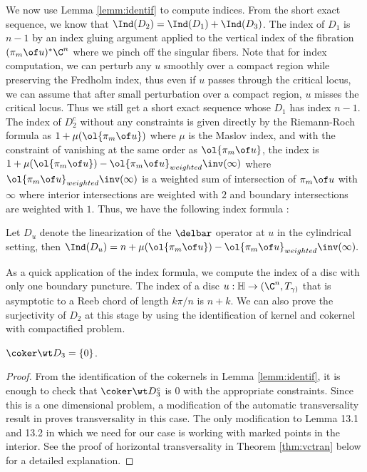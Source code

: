 We now use Lemma \ref{lemm:identif} to compute indices. From the short exact sequence, we know that $\Ind(D_2) = \Ind(D_1) + \Ind (D_3)$. The index of $D_1$ is $n-1$ by an index gluing argument applied to the vertical index of the fibration $(\pi_m \of u )^* \C^n$ where we pinch off the singular fibers. Note that for index computation, we can perturb any $u$ smoothly over a compact region while preserving the Fredholm index, thus even if $u$ passes through the critical locus, we can assume that after small perturbation over a compact region, $u$ misses the critical locus. Thus we still get a short exact sequence whose $D_1$ has index $n-1$.  The index of $D^c_2$ without any constraints is given directly by the Riemann-Roch formula as $1 + \mu(\ol{\pi_m \of u})$ where $\mu$ is the Maslov index, and with the constraint of vanishing at the same order as $\ol{\pi_m \of u}$, the index is $1 + \mu(\ol{\pi_m \of u}) - \ol{\pi_m \of u }_{weighted} \inv (\infty)$ where $\ol{\pi_m \of u }_{weighted} \inv (\infty)$ is a weighted sum of intersection of $\pi_m \of u$ with $\infty$ where interior intersections are weighted with $2$ and boundary intersections are weighted with $1$. Thus, we have the following index formula :

\begin{lemma}\label{indexLemm}
Let $D_u $ denote the linearization of the $\delbar$ operator at $u$ in the cylindrical setting, then 
$ \Ind(D_u) = n + \mu(\ol{\pi_m \of u}) - \ol{\pi_m \of u }_{weighted} \inv (\infty).$
\end{lemma}
\begin{remark} \label{rem:indexsinglepunct}

As a quick application of the index formula, we  compute the index of a disc with only one boundary puncture. The index of a disc $u : \mathbb{H} \to (\C^n, T_{\gamma)}$ that is asymptotic to a Reeb chord of length $k\pi/n$ is $n+k$. We can also prove the surjectivity of $D_2$ at this stage by using the identification of kernel and cokernel with compactified problem.
\end{remark}
\begin{Theorem} \label{thm:hortran}
$\coker \wt D_3 = \{0\}$.
\end{Theorem}

\begin{proof}
From the identification of the cokernels in Lemma \ref{lemm:identif}, it is enough to check that $\coker \wt D^c_3$ is 0 with the appropriate constraints. Since this is a one dimensional problem, a modification of the automatic transversality result in \cite{seidelFuk} proves transversality in this case. The only modification to Lemma 13.1 and 13.2 in \cite{seidelFuk} which we need for our case is working with marked points in the interior. See the proof of horizontal transversality in Theorem \ref{thm:vctran} below for a detailed explanation.
\end{proof}

